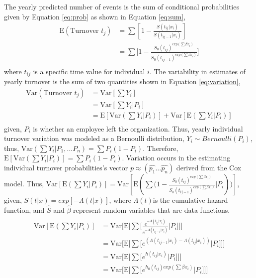 The yearly predicted number of events is the sum of conditional probabilities given by Equation \ref{eq:prob} as shown in Equation \ref{eq:sum},
\begin{equation}
\label{eq:sum}
\begin{split}
\mathrm{E}(\text{Turnover } t_j)&=\sum{[1-\frac{S(t_{ij}|x_i)}{S(t_{ij-1}|x_i)}]}\\
&=\sum{\big[1-\frac{{S_0(t_{ij})}^{exp(\sum\beta x_i)}}{   {S_0(t_{ij-1})}^{exp(\sum\beta x_i)}}\big]}\\
\end{split}
\end{equation}
where $t_{ij}$ is a specific time value for individual $i$. 
The variability in estimates of yearly turnover is the sum of two quantities shown in Equation \ref{eq:variation},
\begin{equation}
\label{eq:variation}
\begin{split}
\mathrm{Var}(\text{Turnover }  t_j) &=\mathrm{Var}[\sum{Y_i}]\\
&=\mathrm{Var}[\sum{Y_i|P_i}] \\
&=\mathrm{E}[\mathrm{Var}(\sum{Y_i|P_i})]+\mathrm{Var}[\mathrm{E}(\sum{Y_i|P_i})]\\ 
\end{split}
\end{equation}
given, $P_i$ is whether an employee left the organization. Thus, yearly individual turnover variation was modeled as a Bernoulli distribution, $Y_i \sim Bernoulli(P_i)$, thus, $\mathrm{Var}(\sum{Y_i|P_1,...P_n})=\sum{P_i(1-P_i)}$. Therefore, $\mathrm{E}[\mathrm{Var}(\sum{Y_i|P_i})]=\sum{P_i(1-P_i)}$. 
Variation occurs in the estimating individual turnover probabilities's vector $p\approx (\hat{p_1} \dots \hat{p_n})$ derived from the Cox model. Thus, $\mathrm{Var}[\mathrm{E}(\sum{Y_i|P_i})]=\mathrm{Var}[\mathrm{E}(\sum{(1-\frac{{S_0(t_{ij})}^{exp(\sum\beta x_i)}}{   {S_0(t_{ij-1})}^{exp(\sum\beta x_i)}}|P_i}))]$, given, $S(t|x)=exp[-\Lambda(t|x)] $, where $\Lambda(t)$is the cumulative hazard function, and $\hat{S}$ and $\hat{\beta}$ represent random variables that are data functions.
\begin{align*}
\begin{split}
\mathrm{Var}[\mathrm{E}(\sum{Y_i|P_i})]
&=\mathrm{Var}\big[\mathrm{E}\big[\sum{\big[\frac{e^{-\Lambda (t_{ij}|x_i)}}{e^{-\Lambda (t_{ij-1}|x_i)}}|P_i\big]} \big]\big]	\\
&=\mathrm{Var}\big[\mathrm{E}\big[\sum{\big[{e^{(\Lambda (t_{ij-1}|x_i)-\Lambda (t_{ij}|x_i))}|P_i}\big]}\big]\big]	\\
&=\mathrm{Var}\big[\mathrm{E}\big[\sum{\big[{e^{h(t_{ij}|x_i)}|P_i}\big]}\big]\big]		\\
&=\mathrm{Var}\big[\mathrm{E}\big[\sum{\big[{e^{h_0(t_{ij})exp(\sum{\beta x_i})}|P_i}\big]}\big]\big]		\\
\end{split}
\end{align*}
